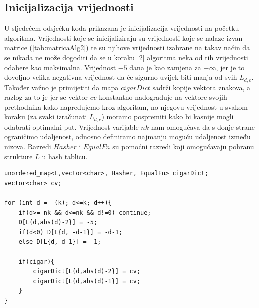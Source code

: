 \documentclass[times, utf8, zavrsni]{fer}
\begin{document}
\subsection{Inicijalizacija vrijednosti}
U sljedećem odsječku koda prikazana je inicijalizacija vrijednosti na početku algoritma. Vrijednosti koje se inicijaliziraju su vrijednosti koje se nalaze izvan matrice (\ref{tab:matricaAlg2}) te su njihove vrijednosti izabrane na takav način da se nikada ne može dogoditi da se u koraku [2] algoritma neka od tih vrijednosti odabere kao maksimalna. Vrijednost $-5$ dana je kao zamjena za $-\infty$, jer je to dovoljno velika negativna vrijednost da će sigurno uvijek biti manja od svih $L_{d,e}$. Također važno je primijetiti da mapa $cigarDict$ sadrži kopije vektora znakova, a razlog za to je jer se vektor $cv$ konstantno nadograđuje na vektore svojih prethodnika kako napredujemo kroz algoritam, no njegovu vrijednost u svakom koraku (za svaki izračunati $L_{d,e}$) moramo pospremiti kako bi kasnije mogli odabrati optimalni put. Vrijednost varijable $nk$ nam omogućava da s donje strane ograničimo udaljenost, odnosno definiramo najmanju moguću udaljenost između nizova. Razredi $Hasher$ i $EqualFn$ su pomoćni razredi koji omogućavaju pohranu strukture $L$ u hash tablicu.
\newline
\begin{lstlisting}
unordered_map<L,vector<char>, Hasher, EqualFn> cigarDict;
vector<char> cv;

for (int d = -(k); d<=k; d++){
	if(d>=-nk && d<=nk && d!=0) continue;
    D[L{d,abs(d)-2}] = -5;
    if(d<0) D[L{d, -d-1}] = -d-1;
    else D[L{d, d-1}] = -1;

    if(cigar){
        cigarDict[L{d,abs(d)-2}] = cv;
        cigarDict[L{d,abs(d)-1}] = cv;
    }
}
\end{lstlisting}
\end{document}

